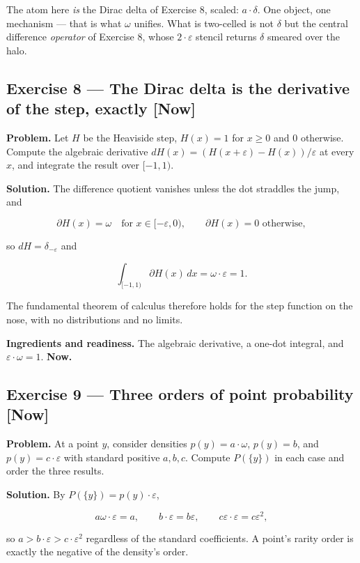 \documentclass[11pt]{article}
\newcommand{\eps}{\varepsilon}
\renewcommand{\epsilon}{\varepsilon}
\begin{document}
The atom here \emph{is} the Dirac delta of Exercise 8, scaled: $a\cdot \delta$. One
object, one mechanism --- that is what $\omega$ unifies. What is two-celled is not
$\delta$ but the central difference \emph{operator} of Exercise 8, whose $2\cdot \eps$
stencil returns $\delta$ smeared over the halo.


\subsection*{Exercise 8 --- The Dirac delta is the derivative of the step, exactly \hfill \normalfont\small[Now]}

\textbf{Problem.} Let $H$ be the Heaviside step, $H(x) = 1$ for $x \ge  0$ and $0$
otherwise. Compute the algebraic derivative $dH(x) = (H(x+\eps)-H(x))/\eps$
at every $x$, and integrate the result over $[-1,1)$.

\textbf{Solution.} The difference quotient vanishes unless the dot straddles the
jump, and

\[
\partial H(x)=\omega \quad\text{for } x\in[-\epsilon,0),
\qquad \partial H(x)=0 \text{ otherwise},
\]

so $dH = \delta_{-\eps}$ and

\[
\int_{[-1,1)}\partial H(x)\,dx=\omega\cdot\epsilon=1 .
\]

The fundamental theorem of calculus therefore holds for the step function on
the nose, with no distributions and no limits.

\textbf{Ingredients and readiness.} The algebraic derivative, a one-dot integral,
and $\eps\cdot \omega = 1$. \textbf{Now.}


\subsection*{Exercise 9 --- Three orders of point probability \hfill \normalfont\small[Now]}

\textbf{Problem.} At a point $y$, consider densities $p(y) = a\cdot \omega$, $p(y) = b$,
and $p(y) = c\cdot \eps$ with standard positive $a,b,c$. Compute $P(\{y\})$ in
each case and order the three results.

\textbf{Solution.} By $P(\{y\}) = p(y)\cdot \eps$,

\[
a\omega\cdot\epsilon=a,
\qquad
b\cdot\epsilon=b\epsilon,
\qquad
c\epsilon\cdot\epsilon=c\epsilon^{2},
\]

so $a > b\cdot \eps > c\cdot \eps^2$ regardless of the standard coefficients. A
point's rarity order is exactly the negative of the density's order.
\end{document}

